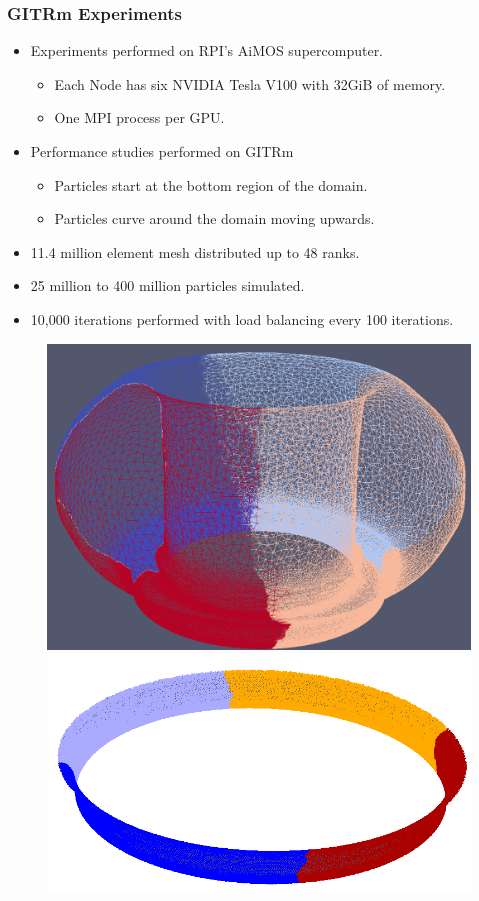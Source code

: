 \documentclass[aspectratio=169]{beamer}
\begin{document}
\begin{frame}
  \frametitle{GITRm Experiments}
  \begin{itemize}
  \item Experiments performed on RPI's AiMOS supercomputer.
    \begin{itemize}
    \item Each Node has six NVIDIA Tesla V100 with 32GiB of memory.
    \item One MPI process per GPU.
    \end{itemize}
  \item Performance studies performed on GITRm
    \begin{itemize}
    \item Particles start at the bottom region of the domain.
    \item Particles curve around the domain moving upwards.
    \end{itemize}
  \item 11.4 million element mesh distributed up to 48 ranks.
  \item 25 million to 400 million particles simulated.
  \item 10,000 iterations performed with load balancing every 100 iterations.
  \end{itemize}
  \begin{figure}
    \includegraphics[height=.3\textheight]{gitrm_part_4.png}
    \includegraphics[height=.3\textheight]{gitrm_ptcl_init.png}

\end{figure}
\end{frame}
\end{document}
